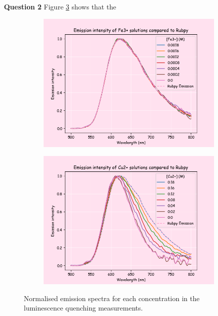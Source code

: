 \noindent \textbf{Question 2}
Figure \ref{fig:part1_dis_q2} shows that the  
\begin{figure}[H]
     \centering
     \begin{subfigure}[b]{0.49\textwidth}
         \centering
         \includegraphics[width=\textwidth]{part1_discussionq2_fe.png}
         \caption{}
         \label{fig:part1_dis_fe}
     \end{subfigure}
     \hfill
     \begin{subfigure}[b]{0.49\textwidth}
         \centering
         \includegraphics[width=\textwidth]{part1_discussionq2_cu.png}
         \caption{}
         \label{fig:part1_dis_Cu}
     \end{subfigure}
     \caption{Normalised emission spectra for each concentration in the luminescence quenching measurements.}
     \label{fig:part1_dis_q2}
\end{figure}
